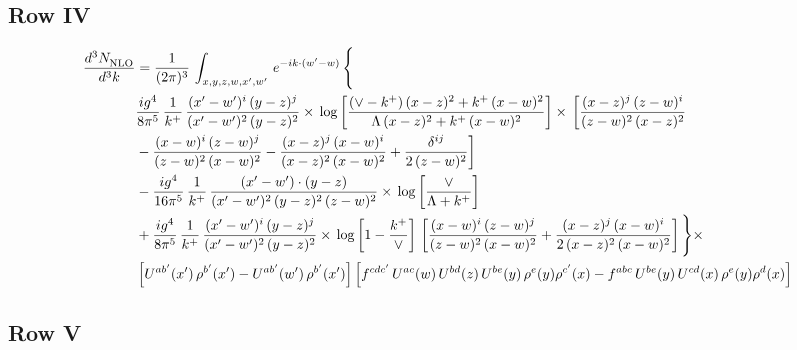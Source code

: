 \documentclass[9pt]{article}
\numberwithin{equation}{section}
\begin{document}
\subsection{Row IV}
\begin{align}
    \frac{d^{3}N_{\rm NLO}^{\rm}}{d^{3}k}  & =  \frac{1}{(2\pi)^{3}}\,
    \int_{x,y,z,w,x',w'}\,e^{-ik\cdot (w^\prime-w)}\,\Bigg\{\notag \\ & \frac{ig^{4}}{8\pi^{5}}\,\frac{1}{k^{+}}\,\frac{(x'-w')^{i}\,(y-z)^{j}}{(x'-w')^{2}\,(y-z)^{2}}\times\,\log{\left[\frac{(\vee-k^{+})\,(x-z)^{2}+k^{+}\,(x-w)^{2}}{\Lambda\, (x-z)^{2} + k^{+}\,(x-w)^{2}}\right]}\times\, \bigg[\frac{(x-z)^{j}\,(z-w)^{i}}{(z-w)^{2}\,(x-z)^{2}}\notag \\ & -\frac{(x-w)^{i}\,(z-w)^{j}}{(z-w)^{2}\,(x-w)^{2}}-\frac{(x-z)^{j}\,(x-w)^{i}}{(x-z)^{2}\,(x-w)^{2}}+\frac{\delta^{ij}}{2\,(z-w)^{2}}\bigg]\notag \\ & -\frac{ig^{4}}{16\pi^{5}}\,\frac{1}{k^{+}}\,\frac{(x'-w')\cdot (y-z)}{(x'-w')^{2}\,(y-z)^{2}\,(z-w)^{2}}\times\,\log{\left[\frac{\vee}{\Lambda + k^{+}}\right]}\notag \\ & + \frac{ig^{4}}{8\pi^{5}}\,\frac{1}{k^{+}}\,\frac{(x'-w')^{i}\,(y-z)^{j}}{(x'-w')^{2}\,(y-z)^{2}}\times\, \log{\left[1-\frac{k^{+}}{\vee}\right]}\,\left[\frac{(x-w)^{i}\,(z-w)^{j}}{(z-w)^{2}\,(x-w)^{2}}+\frac{(x-z)^{j}\,(x-w)^{i}}{2\, (x-z)^{2}\,(x-w)^{2}}\right] \Bigg\}\times\notag \\ &  \left[U^{ab'}(x')\,\rho^{b'}(x')-U^{ab'}(w')\,\rho^{b'}(x')\right] \left[f^{cdc'}\,U^{ac}(w)\,U^{bd}(z)\,U^{be}(y)\,\rho^{e}(y)\rho^{c'}(x)-f^{abc}\,U^{be}(y)\,U^{cd}(x)\,\rho^{e}(y)\rho^{d}(x)\right]
\end{align}
\subsection{Row V}
\end{document}
